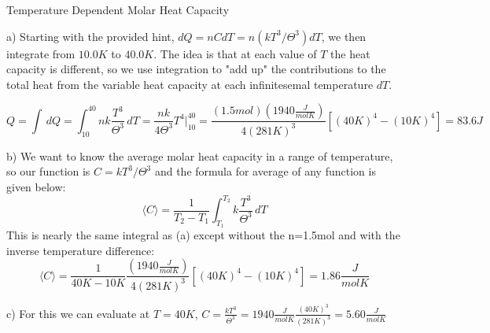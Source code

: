 \documentclass[10pt]{article}
\newenvironment{problem}[2][Problem]{\begin{trivlist}
\item[\hskip \labelsep {\bfseries #1}\hskip \labelsep {\bfseries #2.}]}{\end{trivlist}}
\begin{document}
\begin{problem}{3} Temperature Dependent Molar Heat Capacity\\
\item a) Starting with the provided hint, $dQ=nCdT=n(kT^3/\Theta^3)dT$, we then integrate from $10.0K$ to $40.0K$. The idea is that at each value of $T$ the heat capacity is different, so we use integration to "add up" the contributions to the total heat from the variable heat capacity at each infinitesemal temperature $dT$.

\[
Q = \int  \,dQ = \int_{10}^{40} nk \frac{T^3}{\Theta^3} \,dT = \frac{nk}{4\Theta^3}T^4\Big|_{10}^{40}=\frac{(1.5mol)(1940\frac{J}{molK})}{4(281K)^3}\left[(40K)^4-(10K)^4\right]=83.6J
\]
\item b) We want to know the average molar heat capacity in a range of temperature, so our function is $C = kT^3/\Theta^3$ and the formula for average of any function is given below:
\[
\langle C \rangle = \frac{1}{T_2-T_1}\int_{T_1}^{T_2} k \frac{T^3}{\Theta^3} \,dT
\]
This is nearly the same integral as (a) except without the n=1.5mol and with the inverse temperature difference:
\[
\langle C \rangle = \frac{1}{40K-10K}\frac{(1940\frac{J}{molK})}{4(281K)^3}\left[(40K)^4-(10K)^4\right]=1.86\frac{J}{molK}
\]
\item c) For this we can evaluate at $T=40K$, $C=\frac{kT^3}{\Theta^3}=1940\frac{J}{molK}\frac{(40K)^3}{(281K)^3}=5.60\frac{J}{molK}$

\end{problem}
\end{document}

